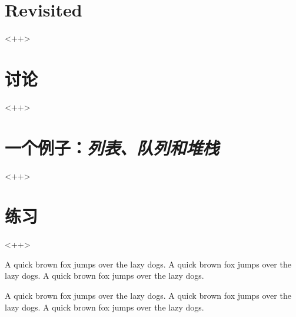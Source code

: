 \section{ Revisited}<++>

\section{讨论}<++>

\section{一个例子：\emph{列表、队列和堆栈}}<++>

\section{练习}<++>

A quick brown fox jumps over the lazy dogs.
A quick brown fox jumps over the lazy dogs.
A quick brown fox jumps over the lazy dogs.

A quick brown fox jumps over the lazy dogs.
A quick brown fox jumps over the lazy dogs.
A quick brown fox jumps over the lazy dogs.


